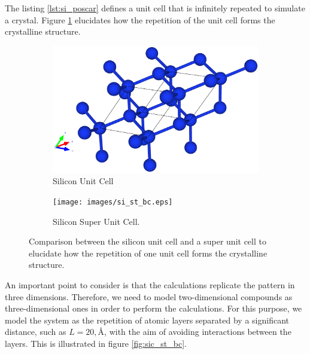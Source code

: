 The listing \ref{lst:si_poscar} defines a unit cell that is infinitely repeated to simulate a crystal. Figure \ref{fig:si_st_rep} elucidates how the repetition of the unit cell forms the crystalline structure.

\begin{figure}[!ht]
    \begin{subfigure}[b]{.5\textwidth}%
        \centering
        \includegraphics[width=\linewidth]{images/si_st.eps}
        \caption{Silicon Unit Cell}
    \end{subfigure}%
    \begin{subfigure}[b]{.5\textwidth}%
        \centering
        \texttt{[image: images/si\_st\_bc.eps]}
        \caption{Silicon Super Unit Cell.}
    \end{subfigure}%
    \caption{Comparison between the silicon unit cell and a super unit cell to elucidate how the repetition of one unit cell forms the crystalline structure.}
    \label{fig:si_st_rep}
\end{figure}

An important point to consider is that the calculations replicate the pattern in three dimensions. Therefore, we need to model two-dimensional compounds as three-dimensional ones in order to perform the calculations. For this purpose, we model the system as the repetition of atomic layers separated by a significant distance, such as $L = 20,\text{\AA}$, with the aim of avoiding interactions between the layers. This is illustrated in figure \ref{fig:sic_st_bc}.

